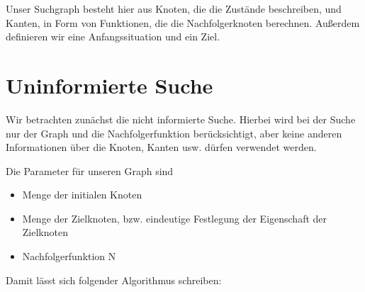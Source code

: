 Unser Suchgraph besteht hier aus Knoten, die die Zustände beschreiben, und Kanten, in Form von Funktionen, die die Nachfolgerknoten berechnen. Außerdem definieren wir eine Anfangssituation und ein Ziel.




\section{Uninformierte Suche}
Wir betrachten zunächst die nicht informierte Suche. Hierbei wird bei der Suche nur der Graph und die Nachfolgerfunktion berücksichtigt, aber keine anderen Informationen über die Knoten, Kanten usw. dürfen verwendet werden.

Die Parameter für unseren Graph sind

\begin{itemize}
  \item Menge der initialen Knoten
  \item Menge der Zielknoten, bzw. eindeutige Festlegung der Eigenschaft der Zielknoten
  \item Nachfolgerfunktion N
\end{itemize}

Damit lässt sich folgender Algorithmus schreiben:


